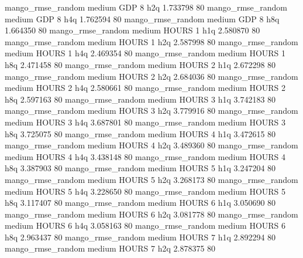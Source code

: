 mango_rmse_random     medium      GDP                 8                  h2q  1.733798 80
mango_rmse_random     medium      GDP                 8                  h4q  1.762594 80
mango_rmse_random     medium      GDP                 8                  h8q  1.664350 80
mango_rmse_random     medium    HOURS                 1                  h1q  2.580870 80
mango_rmse_random     medium    HOURS                 1                  h2q  2.587998 80
mango_rmse_random     medium    HOURS                 1                  h4q  2.469354 80
mango_rmse_random     medium    HOURS                 1                  h8q  2.471458 80
mango_rmse_random     medium    HOURS                 2                  h1q  2.672298 80
mango_rmse_random     medium    HOURS                 2                  h2q  2.684036 80
mango_rmse_random     medium    HOURS                 2                  h4q  2.580661 80
mango_rmse_random     medium    HOURS                 2                  h8q  2.597163 80
mango_rmse_random     medium    HOURS                 3                  h1q  3.742183 80
mango_rmse_random     medium    HOURS                 3                  h2q  3.779916 80
mango_rmse_random     medium    HOURS                 3                  h4q  3.687801 80
mango_rmse_random     medium    HOURS                 3                  h8q  3.725075 80
mango_rmse_random     medium    HOURS                 4                  h1q  3.472615 80
mango_rmse_random     medium    HOURS                 4                  h2q  3.489360 80
mango_rmse_random     medium    HOURS                 4                  h4q  3.438148 80
mango_rmse_random     medium    HOURS                 4                  h8q  3.387903 80
mango_rmse_random     medium    HOURS                 5                  h1q  3.247204 80
mango_rmse_random     medium    HOURS                 5                  h2q  3.268173 80
mango_rmse_random     medium    HOURS                 5                  h4q  3.228650 80
mango_rmse_random     medium    HOURS                 5                  h8q  3.117407 80
mango_rmse_random     medium    HOURS                 6                  h1q  3.050690 80
mango_rmse_random     medium    HOURS                 6                  h2q  3.081778 80
mango_rmse_random     medium    HOURS                 6                  h4q  3.058163 80
mango_rmse_random     medium    HOURS                 6                  h8q  2.963437 80
mango_rmse_random     medium    HOURS                 7                  h1q  2.892294 80
mango_rmse_random     medium    HOURS                 7                  h2q  2.878375 80

